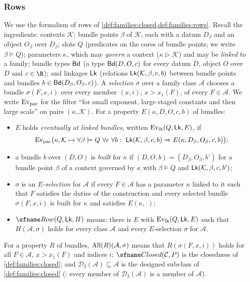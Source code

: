 \subsubsection{Rows}
We use the formalism of rows of \cref{def:families:closed,def:families:rows}. Recall the ingredients: contexts $\mathcal K$;
bundle points $\beta$ of $\mathcal K$, each with a datum $D_\beta$ and an object $O_\beta$ over $D_\beta$; slots $Q$
(predicates on the cores of bundle points; we write $\beta\models Q$); parameters $\kappa$, which may \emph{govern} a
context ($\kappa\rhd\mathcal K$) and may be \emph{linked} to a family; bundle types $\mathsf{Bd}$ (a type $\mathsf{Bd}(D,O,c)$ for every
datum $D$, object $O$ over $D$ and $c\in\R$); and linkages $\mathsf{Lk}$ (relations $\mathsf{Lk}(\mathcal K,\beta,c,b)$ between bundle
points and bundles $b\in\mathsf{Bd}(D_\beta,O_\beta,c)$). A \emph{selection} $\sigma$ over a family class $\mathcal A$
chooses a bundle $\sigma(F,x,i)$ over every member $(x,i)$, $x>x_1(F)$, of every $F\in\mathcal A$. We write $\mathrm{Ev}_{\mathrm{par}}$
for the filter ``for small exponent, large staged constants and then large scale'' on pairs $(\kappa,\mathcal K)$. For a
property $E(\kappa,D,O,c,b)$ of bundles:
\begin{itemize}
\item $E$ holds \emph{eventually at linked bundles}, written $\mathrm{Ev}_{\mathrm{lk}}(Q,\mathsf{Lk},E)$, if
  \[
  \mathrm{Ev}_{\mathrm{par}}\bigl(\kappa,\mathcal K\mapsto\forall\beta\models Q\ \forall c\ \forall b:\
  \mathsf{Lk}(\mathcal K,\beta,c,b)\Rightarrow E(\kappa,D_\beta,O_\beta,c,b)\bigr);
  \]
\item a bundle $b$ over $(D,O)$ is \emph{built} for $\kappa$ if $(D,O,b)=(D_\beta,O_\beta,b')$ for a bundle point
  $\beta$ of a context governed by $\kappa$ with $\beta\models Q$ and $\mathsf{Lk}(\mathcal K,\beta,c,b')$;
\item $\sigma$ is an \emph{$E$-selection} for $\mathcal A$ if every $F\in\mathcal A$ has a parameter $\kappa$ linked to
  it such that $F$ satisfies the duties of the construction and every selected bundle $\sigma(F,x,i)$ is built for
  $\kappa$ and satisfies $E(\kappa,\cdot)$;
\item $\reckRow(Q,\reckLk,H)$ means: there is $E$ with $\mathrm{Ev}_{\mathrm{lk}}(Q,\mathsf{Lk},E)$ such that $H(\mathcal A,\sigma)$ holds
  for every class $\mathcal A$ and every $E$-selection $\sigma$ for $\mathcal A$.
\end{itemize}
For a property $R$ of bundles, $\mathrm{All}(R)(\mathcal A,\sigma)$ means that $R(\sigma(F,x,i))$ holds for all
$F\in\mathcal A$, $x>x_1(F)$ and indices $i$; $\reckClosed(\mathcal C,P)$ is the closedness of
\cref{def:families:closed}; and $\mathcal D_3(\mathcal A)\subseteq\mathcal A$ is the designed subclass of
\cref{def:families:closed} (\lref{GlobalTheory.Cp.d3_a}: every member of $\mathcal D_3(\mathcal A)$ is a member of
$\mathcal A$).


